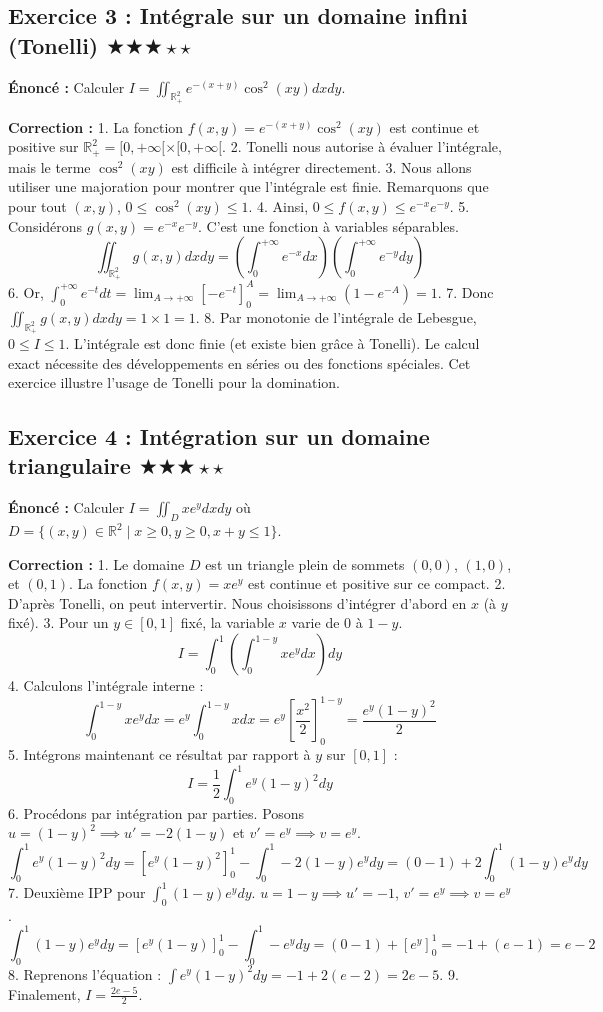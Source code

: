 \documentclass[11pt,a4paper]{article}
\begin{document}
\subsection*{Exercice 3 : Intégrale sur un domaine infini (Tonelli) \quad $\bigstar\bigstar\bigstar\star\star$}

\textbf{Énoncé :}
Calculer $I = \iint_{\mathbb{R}_+^2} e^{-(x+y)} \cos^2(xy) dx dy$.

\textbf{Correction :}
1. La fonction $f(x, y) = e^{-(x+y)} \cos^2(xy)$ est continue et positive sur $\mathbb{R}_+^2 = [0, +\infty[ \times [0, +\infty[$.
2. Tonelli nous autorise \`a évaluer l'intégrale, mais le terme $\cos^2(xy)$ est difficile \`a intégrer directement.
3. Nous allons utiliser une majoration pour montrer que l'intégrale est finie. Remarquons que pour tout $(x, y)$, $0 \le \cos^2(xy) \le 1$.
4. Ainsi, $0 \le f(x, y) \le e^{-x} e^{-y}$.
5. Considérons $g(x, y) = e^{-x} e^{-y}$. C'est une fonction \`a variables séparables.
   $$ \iint_{\mathbb{R}_+^2} g(x, y) dx dy = \left( \int_0^{+\infty} e^{-x} dx \right) \left( \int_0^{+\infty} e^{-y} dy \right) $$
6. Or, $\int_0^{+\infty} e^{-t} dt = \lim_{A \to +\infty} [-e^{-t}]_0^A = \lim_{A \to +\infty} (1 - e^{-A}) = 1$.
7. Donc $\iint_{\mathbb{R}_+^2} g(x, y) dx dy = 1 \times 1 = 1$.
8. Par monotonie de l'intégrale de Lebesgue, $0 \le I \le 1$. L'intégrale est donc finie (et existe bien grâce \`a Tonelli). Le calcul exact nécessite des développements en séries ou des fonctions spéciales. Cet exercice illustre l'usage de Tonelli pour la domination.


\subsection*{Exercice 4 : Intégration sur un domaine triangulaire \quad $\bigstar\bigstar\bigstar\star\star$}

\textbf{Énoncé :}
Calculer $I = \iint_D x e^y dx dy$ où $D = \{(x, y) \in \mathbb{R}^2 \mid x \ge 0, y \ge 0, x + y \le 1\}$.

\textbf{Correction :}
1. Le domaine $D$ est un triangle plein de sommets $(0,0)$, $(1,0)$, et $(0,1)$. La fonction $f(x,y) = x e^y$ est continue et positive sur ce compact.
2. D'après Tonelli, on peut intervertir. Nous choisissons d'intégrer d'abord en $x$ (\`a $y$ fixé).
3. Pour un $y \in [0, 1]$ fixé, la variable $x$ varie de $0$ \`a $1 - y$.
   $$ I = \int_0^1 \left( \int_0^{1-y} x e^y dx \right) dy $$
4. Calculons l'intégrale interne :
   $$ \int_0^{1-y} x e^y dx = e^y \int_0^{1-y} x dx = e^y \left[ \frac{x^2}{2} \right]_0^{1-y} = \frac{e^y(1-y)^2}{2} $$
5. Intégrons maintenant ce résultat par rapport \`a $y$ sur $[0, 1]$ :
   $$ I = \frac{1}{2} \int_0^1 e^y(1-y)^2 dy $$
6. Procédons par intégration par parties. Posons $u = (1-y)^2 \implies u' = -2(1-y)$ et $v' = e^y \implies v = e^y$.
   $$ \int_0^1 e^y(1-y)^2 dy = \left[ e^y(1-y)^2 \right]_0^1 - \int_0^1 -2(1-y)e^y dy = (0 - 1) + 2 \int_0^1 (1-y)e^y dy $$
7. Deuxième IPP pour $\int_0^1 (1-y)e^y dy$. $u = 1-y \implies u' = -1$, $v' = e^y \implies v = e^y$.
   $$ \int_0^1 (1-y)e^y dy = \left[ e^y(1-y) \right]_0^1 - \int_0^1 -e^y dy = (0 - 1) + [e^y]_0^1 = -1 + (e - 1) = e - 2 $$
8. Reprenons l'équation : $\int e^y(1-y)^2 dy = -1 + 2(e - 2) = 2e - 5$.
9. Finalement, $I = \frac{2e - 5}{2}$.
\end{document}
